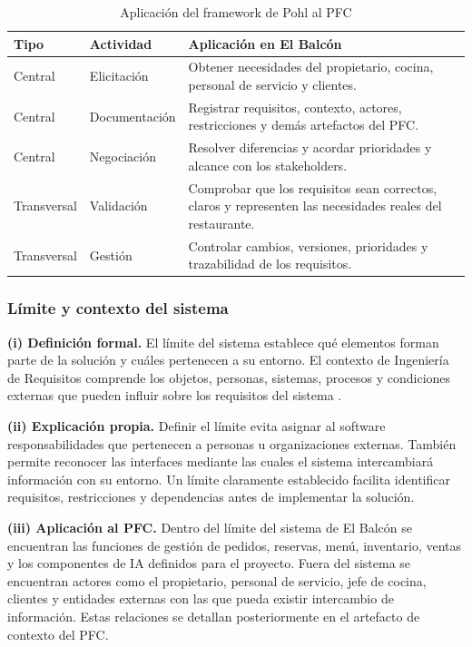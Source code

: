 \begin{table}[H]
\centering
\footnotesize
\caption{Aplicación del framework de Pohl al PFC}
\label{tab:framework-pohl}
\begin{tabularx}{\textwidth}{@{}p{}p{}Y@{}}
\toprule
\textbf{Tipo} & \textbf{Actividad} & \textbf{Aplicación en El Balcón} \\
\midrule
Central &
Elicitación &
Obtener necesidades del propietario, cocina, personal de servicio y clientes. \\

Central &
Documentación &
Registrar requisitos, contexto, actores, restricciones y demás artefactos del PFC. \\

Central &
Negociación &
Resolver diferencias y acordar prioridades y alcance con los stakeholders. \\

Transversal &
Validación &
Comprobar que los requisitos sean correctos, claros y representen las
necesidades reales del restaurante. \\

Transversal &
Gestión &
Controlar cambios, versiones, prioridades y trazabilidad de los requisitos. \\
\bottomrule
\end{tabularx}
\end{table}

\subsubsection{Límite y contexto del sistema}

\textbf{(i) Definición formal.}
El límite del sistema establece qué elementos forman parte de la solución y
cuáles pertenecen a su entorno. El contexto de Ingeniería de Requisitos
comprende los objetos, personas, sistemas, procesos y condiciones externas
que pueden influir sobre los requisitos del sistema
\cite{ieee29148,pohl2025}.

\textbf{(ii) Explicación propia.}
Definir el límite evita asignar al software responsabilidades que pertenecen
a personas u organizaciones externas. También permite reconocer las
interfaces mediante las cuales el sistema intercambiará información con su
entorno. Un límite claramente establecido facilita identificar requisitos,
restricciones y dependencias antes de implementar la solución.

\textbf{(iii) Aplicación al PFC.}
Dentro del límite del sistema de El Balcón se encuentran las funciones de
gestión de pedidos, reservas, menú, inventario, ventas y los componentes de
IA definidos para el proyecto. Fuera del sistema se encuentran actores como
el propietario, personal de servicio, jefe de cocina, clientes y entidades
externas con las que pueda existir intercambio de información. Estas
relaciones se detallan posteriormente en el artefacto de contexto del PFC.
